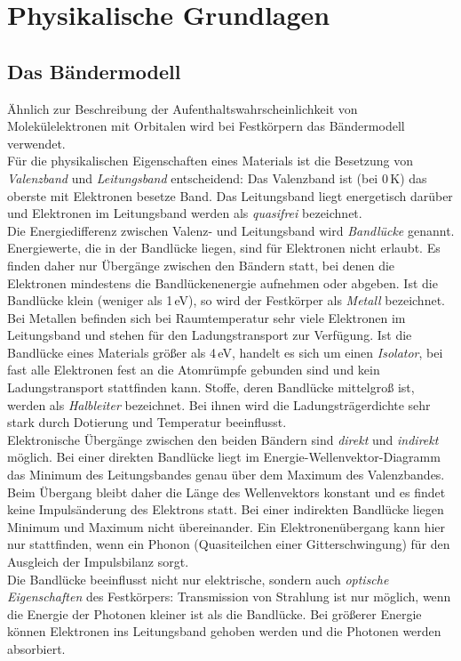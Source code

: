 \section{Physikalische Grundlagen}

\subsection{Das Bändermodell}

Ähnlich zur Beschreibung der Aufenthaltswahrscheinlichkeit von Molekülelektronen mit Orbitalen
wird bei Festkörpern das Bändermodell verwendet.\\
Für die physikalischen Eigenschaften eines Materials
ist die Besetzung von \emph{Valenzband} und \emph{Leitungsband} entscheidend:
Das Valenzband ist (bei 0\,K) das oberste mit Elektronen besetze Band.
Das Leitungsband liegt energetisch darüber und Elektronen im Leitungsband werden als \emph{quasifrei}
bezeichnet.\\
Die Energiedifferenz zwischen Valenz- und Leitungsband wird \emph{Bandlücke} genannt.
Energiewerte, die in der Bandlücke liegen, sind für Elektronen nicht erlaubt.
Es finden daher nur Übergänge zwischen den Bändern statt,
bei denen die Elektronen mindestens die Bandlückenenergie aufnehmen oder abgeben.
Ist die Bandlücke klein (weniger als 1\,eV), so wird der Festkörper als \emph{Metall} bezeichnet.
Bei Metallen befinden sich bei Raumtemperatur sehr viele Elektronen im Leitungsband und stehen 
für den Ladungstransport zur Verfügung.
Ist die Bandlücke eines Materials größer als 4\,eV, handelt es sich um einen \emph{Isolator},
bei fast alle Elektronen
fest an die Atomrümpfe gebunden sind und kein Ladungstransport stattfinden kann.
Stoffe, deren Bandlücke mittelgroß ist, werden als \emph{Halbleiter} bezeichnet.
Bei ihnen wird die Ladungsträgerdichte sehr stark durch Dotierung und Temperatur beeinflusst.\\
Elektronische Übergänge zwischen den beiden Bändern sind \emph{direkt} und \emph{indirekt} möglich.
Bei einer direkten Bandlücke liegt im Energie-Wellenvektor-Diagramm das Minimum des Leitungsbandes
genau über dem Maximum des Valenzbandes.
Beim Übergang bleibt daher die Länge des Wellenvektors konstant und
es findet keine Impulsänderung des Elektrons statt.
Bei einer indirekten Bandlücke liegen Minimum und Maximum nicht übereinander.
Ein Elektronenübergang kann hier nur stattfinden,
wenn ein Phonon (Quasiteilchen einer Gitterschwingung) für den Ausgleich der Impulsbilanz sorgt.\\[0.15cm]
Die Bandlücke beeinflusst nicht nur elektrische, sondern auch \emph{optische Eigenschaften} des Festkörpers:
Transmission von Strahlung ist nur möglich,
wenn die Energie der Photonen kleiner ist als die Bandlücke.
Bei größerer Energie können Elektronen ins Leitungsband gehoben werden und die Photonen werden absorbiert.


